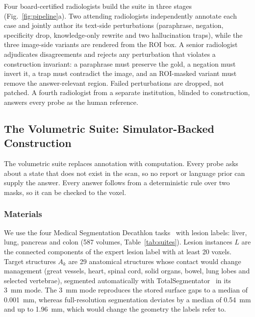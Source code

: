Four board-certified radiologists build the suite in three stages
(Fig.~\ref{fig:pipeline}a). Two attending radiologists independently
annotate each case and jointly author its text-side perturbations
(paraphrase, negation, specificity drop, knowledge-only rewrite and two
hallucination traps), while the three image-side variants are rendered from
the ROI box. A senior radiologist adjudicates disagreements and rejects any
perturbation that violates a construction invariant: a paraphrase must
preserve the gold, a negation must invert it, a trap must contradict the
image, and an ROI-masked variant must remove the answer-relevant region.
Failed perturbations are dropped, not patched. A fourth radiologist from a separate institution, blinded
to construction, answers every probe as the human reference.

\subsection{The Volumetric Suite: Simulator-Backed Construction}
\label{sec:methods_3d}

The volumetric suite replaces annotation with computation. Every probe asks
about a state that does not exist in the scan, so no report or language
prior can supply the answer. Every answer follows from a deterministic rule
over two masks, so it can be checked to the voxel.

\subsubsection{Materials} We use the four Medical Segmentation Decathlon
tasks~\cite{antonelli2022msd} with lesion labels: liver, lung, pancreas and
colon (587 volumes, Table~\ref{tab:suites}). Lesion instances $L$ are the
connected components of the expert lesion label with at least 20 voxels.
Target structures $A_k$ are 29 anatomical structures whose contact would
change management (great vessels, heart, spinal cord, solid organs, bowel,
lung lobes and selected vertebrae), segmented automatically with
TotalSegmentator~\cite{wasserthal2023totalsegmentator} in its 3~mm mode.
The 3~mm mode reproduces the stored surface gaps to a median of 0.001~mm,
whereas full-resolution segmentation deviates by a median of 0.54~mm and up
to 1.96~mm, which would change the geometry the labels refer to.

